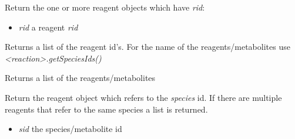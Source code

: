 \documentclass[a4paper,11pt,english]{sphinxmanual}
\begin{document}
\begin{fulllineitems}

\begin{fulllineitems}
\label{modules_doc:cbmpy.CBModel.Reaction.getReagent}
Return the one or more reagent objects which have \emph{rid}:
\begin{itemize}
\item {} 
\emph{rid} a reagent \emph{rid}

\end{itemize}

\end{fulllineitems}


\begin{fulllineitems}
\label{modules_doc:cbmpy.CBModel.Reaction.getReagentObjIds}
Returns a list of the reagent id's. For the name of the reagents/metabolites use \emph{\textless{}reaction\textgreater{}.getSpeciesIds()}

\end{fulllineitems}


\begin{fulllineitems}
\label{modules_doc:cbmpy.CBModel.Reaction.getReagentRefs}
Returns a list of the reagents/metabolites

\end{fulllineitems}


\begin{fulllineitems}
\label{modules_doc:cbmpy.CBModel.Reaction.getReagentWithSpeciesRef}
Return the reagent object which refers to the \emph{species} id. If there are multiple reagents that
refer to the same species a list is returned.
\begin{itemize}
\item {} 
\emph{sid} the species/metabolite id

\end{itemize}

\end{fulllineitems}


\end{fulllineitems}
\end{document}
